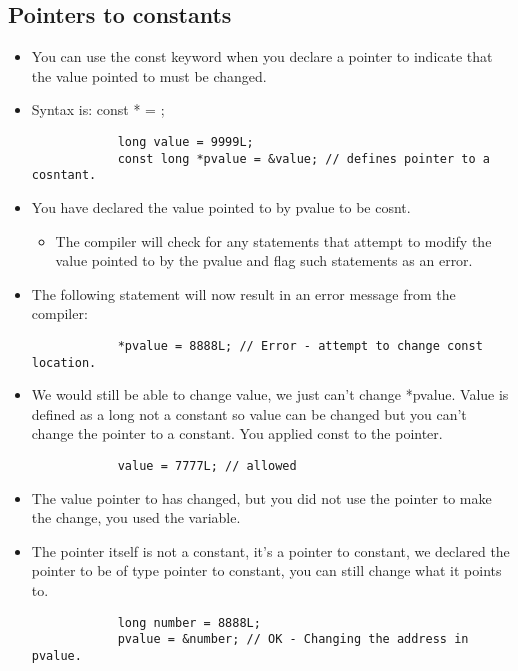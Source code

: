 \subsection{Pointers to constants}
\begin{itemize}
    \item You can use the const keyword when you declare a pointer to indicate that the value pointed to must be changed. 
    \item Syntax is: const  * = ; 
        \begin{verbatim}
            long value = 9999L; 
            const long *pvalue = &value; // defines pointer to a cosntant. 
        \end{verbatim}

    \item You have declared the value pointed to by pvalue to be cosnt. 
        \begin{itemize}
            \item The compiler will check for any statements that attempt to modify the value pointed to by the pvalue and flag such statements as an error. 
        \end{itemize}
    
    \item The following statement will now result in an error message from the compiler: 
        \begin{verbatim}
            *pvalue = 8888L; // Error - attempt to change const location. 
        \end{verbatim}
    
    
    \item We would still be able to change value, we just can't change *pvalue. Value is defined as a long not a constant so value can be changed but you can't change the pointer to a constant. You applied const to the pointer. 
        \begin{verbatim}
            value = 7777L; // allowed
        \end{verbatim}
 
    
    \item The value pointer to has changed, but you did not use the pointer to make the change, you used the variable. 
    \item The pointer itself is not a constant, it's a pointer to constant, we declared the pointer to be of type pointer to constant, you can still change what it points to. 
        \begin{verbatim}
            long number = 8888L; 
            pvalue = &number; // OK - Changing the address in pvalue.
        \end{verbatim}
    

\end{itemize}
